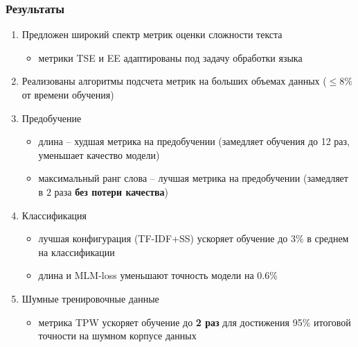 \documentclass{beamer}
\begin{document}
\begin{frame}
	\frametitle{Результаты}
	\begin{enumerate}
		\item Предложен широкий спектр метрик оценки сложности текста
		\begin{itemize}
			\item метрики TSE и EE адаптированы под задачу обработки языка
		\end{itemize}
		\item Реализованы алгоритмы подсчета метрик на больших объемах данных ($\le 8\%$ от времени обучения)
		\item Предобучение
			\begin{itemize}
				\item длина -- худшая метрика на предобучении (замедляет обучения до 12 раз, уменьшает качество модели)
				\item максимальный ранг слова -- лучшая метрика на предобучении (замедляет в $2$ раза {\bf без потери качества})
			\end{itemize}
		\item Классификация
			\begin{itemize}
				\item лучшая конфигурация (TF-IDF+SS) ускоряет обучение до 3\% в среднем на классификации
				\item длина и MLM-loss уменьшают точность модели на 0.6\%
			\end{itemize}
		\item Шумные тренировочные данные
			\begin{itemize}
				\item 
				метрика TPW ускоряет обучение до {\bf 2 раз} для достижения 95\% итоговой точности на шумном корпусе данных
			\end{itemize}
	\end{enumerate}
\end{frame}

\appendix
\end{document}
